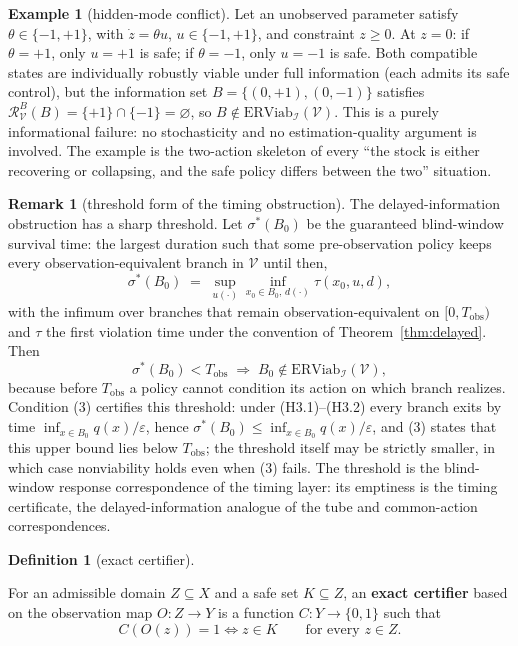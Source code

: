 \documentclass[11pt]{article}
\theoremstyle{definition}
\newtheorem{remark}{Remark}
\newtheorem{example}{Example}
\newtheorem{definition}{Definition}
\begin{document}
\begin{example}[hidden-mode conflict]\label{ex:hidden-mode} Let an unobserved parameter satisfy
\(\theta \in \{-1, +1\}\), with \(\dot z = \theta u\),
\(u \in \{-1, +1\}\), and constraint \(z \ge 0\). At \(z = 0\): if
\(\theta = +1\), only \(u = +1\) is safe; if \(\theta = -1\), only
\(u = -1\) is safe. Both compatible states are individually robustly
viable under full information (each admits its safe control), but the
information set \(B = \{(0, +1), (0, -1)\}\) satisfies
\(\mathcal{R}_{\mathcal{V}}^B(B) = \{+1\} \cap \{-1\} = \varnothing\),
so \(B \notin \mathrm{ERViab}_{\mathcal{I}}(\mathcal{V})\). This is a
purely informational failure: no stochasticity and no estimation-quality
argument is involved. The example is the two-action skeleton of every
``the stock is either recovering or collapsing, and the safe policy
differs between the two'' situation.

\end{example}

\begin{remark}[threshold form of the timing obstruction]\label{rem:sigma}
The delayed-information obstruction has a sharp threshold. Let
\(\sigma^*(B_0)\) be the guaranteed blind-window survival time: the
largest duration such that some pre-observation policy keeps every
observation-equivalent branch in \(\mathcal{V}\) until then,
\[\sigma^*(B_0) \;=\; \sup_{u(\cdot)} \inf_{x_0\in B_0,\, d(\cdot)} \tau(x_0,u,d),\]
with the infimum over branches that remain observation-equivalent on
\([0,T_{\mathrm{obs}})\) and \(\tau\) the first violation time under the
convention of Theorem~\ref{thm:delayed}. Then
\[\sigma^*(B_0) < T_{\mathrm{obs}} \;\Longrightarrow\; B_0 \notin \mathrm{ERViab}_{\mathcal{I}}(\mathcal{V}),\]
because before \(T_{\mathrm{obs}}\) a policy cannot condition its action
on which branch realizes. Condition (3) certifies this threshold: under
(H3.1)--(H3.2) every branch exits by time
\(\inf_{x\in B_0}q(x)/\varepsilon\), hence
\(\sigma^*(B_0)\le\inf_{x\in B_0}q(x)/\varepsilon\), and (3) states that
this upper bound lies below \(T_{\mathrm{obs}}\); the threshold itself
may be strictly smaller, in which case nonviability holds even when (3)
fails. The threshold is the blind-window response correspondence of the
timing layer: its emptiness is the timing certificate, the
delayed-information analogue of the tube and common-action
correspondences.
\end{remark}

\begin{definition}[exact certifier]\label{def:certifier}

For an admissible domain
\(Z \subseteq X\) and a safe set \(K \subseteq Z\), an \textbf{exact
certifier} based on the observation map \(O : Z \to Y\) is a function
\(C : Y \to \{0,1\}\) such that
\[C(O(z)) = 1 \iff z \in K \qquad \text{for every } z \in Z.\]

\end{definition}
\end{document}
